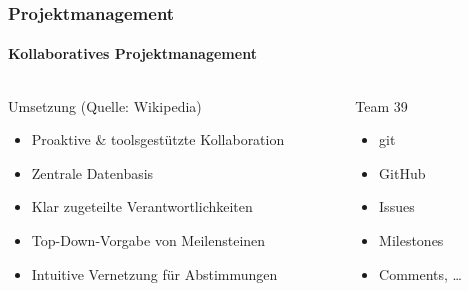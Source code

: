 \begin{frame}
	\frametitle{Projektmanagement \hfill \footnotesize \group}
	\framesubtitle{Kollaboratives Projektmanagement}
	\begin{columns}
		\begin{column}{0.7\textwidth}
			\begin{block}{Umsetzung (Quelle: Wikipedia)}
				\begin{itemize}
					\item Proaktive \& toolsgestützte Kollaboration
					\item Zentrale Datenbasis
					\item Klar zugeteilte Verantwortlichkeiten
					\item Top-Down-Vorgabe von Meilensteinen
					\item Intuitive Vernetzung für Abstimmungen
				\end{itemize}
			\end{block}
		\end{column}
		\begin{column}{0.3\textwidth}
			\begin{exampleblock}{Team 39}
				\begin{itemize}
					\item git
					\item GitHub
					\item Issues
					\item Milestones
					\item Comments, \dots
				\end{itemize}
			\end{exampleblock}
		\end{column}
	\end{columns}
\end{frame}

